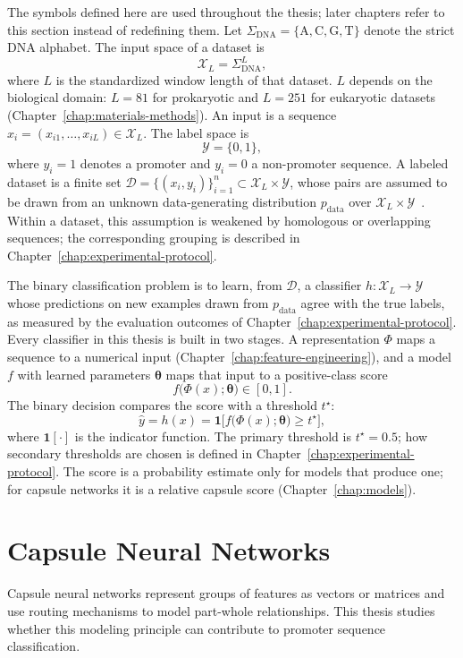 The symbols defined here are used throughout the thesis; later chapters refer
to this section instead of redefining them. Let
$\Sigma_{\mathrm{DNA}}=\{\mathrm{A},\mathrm{C},\mathrm{G},\mathrm{T}\}$ denote
the strict DNA alphabet. The input space of a dataset is
\begin{equation}
  \mathcal{X}_L=\Sigma_{\mathrm{DNA}}^{L},
  \label{eq:bg-input-space}
\end{equation}
where $L$ is the standardized window length of that dataset. $L$ depends on
the biological domain: $L=81$ for prokaryotic and $L=251$ for eukaryotic
datasets (Chapter~\ref{chap:materials-methods}). An input is a sequence
$x_i=(x_{i1},\ldots,x_{iL})\in\mathcal{X}_L$. The label space is
\begin{equation}
  \mathcal{Y}=\{0,1\},
  \label{eq:bg-label-space}
\end{equation}
where $y_i=1$ denotes a promoter and $y_i=0$ a non-promoter sequence. A labeled
dataset is a finite set $\mathcal{D}=\{(x_i,y_i)\}_{i=1}^{n}\subset
\mathcal{X}_L\times\mathcal{Y}$, whose pairs are assumed to be drawn from an
unknown data-generating distribution $p_{\text{data}}$ over
$\mathcal{X}_L\times\mathcal{Y}$~\citep{goodfellow2016deep}. Within a dataset,
this assumption is weakened by homologous or overlapping sequences; the
corresponding grouping is described in Chapter~\ref{chap:experimental-protocol}.

The binary classification problem is to learn, from $\mathcal{D}$, a classifier
$h:\mathcal{X}_L\to\mathcal{Y}$ whose predictions on new examples drawn from
$p_{\text{data}}$ agree with the true labels, as measured by the evaluation
outcomes of Chapter~\ref{chap:experimental-protocol}. Every classifier in this
thesis is built in two stages. A representation $\Phi$ maps a sequence to a
numerical input (Chapter~\ref{chap:feature-engineering}), and a model $f$ with
learned parameters $\boldsymbol{\theta}$ maps that input to a positive-class
score
\begin{equation}
  f\bigl(\Phi(x);\boldsymbol{\theta}\bigr)\in[0,1].
  \label{eq:bg-score}
\end{equation}
The binary decision compares the score with a threshold $t^{\star}$:
\begin{equation}
  \hat y=h(x)=\mathbf{1}\bigl[f\bigl(\Phi(x);\boldsymbol{\theta}\bigr)\ge t^{\star}\bigr],
  \label{eq:bg-decision}
\end{equation}
where $\mathbf{1}[\cdot]$ is the indicator function. The primary threshold is
$t^{\star}=0.5$; how secondary thresholds are chosen is defined in
Chapter~\ref{chap:experimental-protocol}. The score is a probability estimate
only for models that produce one; for capsule networks it is a relative
capsule score (Chapter~\ref{chap:models}).

\section{Capsule Neural Networks}\label{sec:bg-capsules}

Capsule neural networks represent groups of features as vectors or matrices and
use routing mechanisms to model part-whole relationships. This thesis studies
whether this modeling principle can contribute to promoter sequence
classification.
